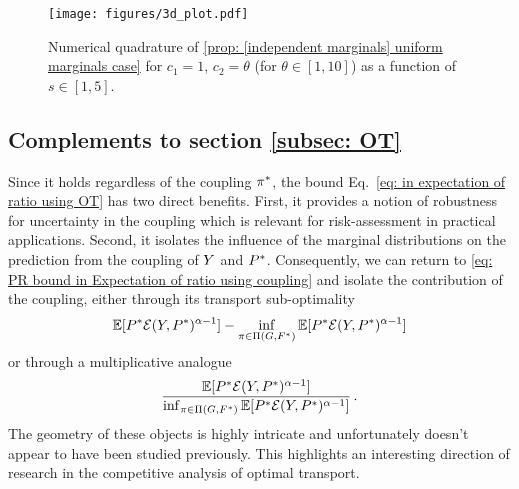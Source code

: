\begin{figure}
    \centering
\texttt{[image: figures/3d\_plot.pdf]}
    \caption{Numerical quadrature of \cref{prop: [independent marginals] uniform marginals case} for $c_1=1$, $c_2=\theta$ (for $\theta\in[1,10]$) as a function of $s\in[1,5]$.}
    \label{fig:3D plot}
\end{figure}


\subsection{Complements to section \ref{subsec: OT}}\label{subapp: OT}

Since it holds regardless of the coupling $\pi^*$, the bound Eq.~\eqref{eq: in expectation of ratio using OT} has two direct benefits. First, it provides a notion of robustness for uncertainty in the coupling which is relevant for risk-assessment in practical applications. Second, it isolates the influence of the marginal distributions on the prediction from the coupling of $Y$ and $P^*$. Consequently, we can return to \eqref{eq: PR bound in Expectation of ratio using coupling} and isolate the contribution of the coupling, either through its transport sub-optimality 
\[
    \mathbb{E}[P^*\mathcal{E}(Y,P^*)^{\alpha-1}]-\inf_{\pi\in\Pi(G,F^*)}\mathbb{E}[P^*\mathcal{E}(Y,P^*)^{\alpha-1}]
\]
or through a multiplicative analogue
\[
    \frac{\mathbb{E}[P^*\mathcal{E}(Y,P^*)^{\alpha-1}]}{\inf_{\pi\in\Pi(G,F^*)}\mathbb{E}[P^*\mathcal{E}(Y,P^*)^{\alpha-1}]}\,.
\]
The geometry of these objects is highly intricate and unfortunately doesn't appear to have been studied previously. This highlights an interesting direction of research in the competitive analysis of optimal transport. 



